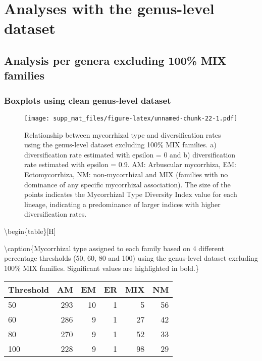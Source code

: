 \documentclass[]{article}
\begin{document}
\hypertarget{analyses-with-the-genus-level-dataset}{%
\section{Analyses with the genus-level
dataset}\label{analyses-with-the-genus-level-dataset}}

\hypertarget{analysis-per-genera-excluding-100-mix-families}{%
\subsection{Analysis per genera excluding 100\% MIX
families}\label{analysis-per-genera-excluding-100-mix-families}}

\hypertarget{boxplots-using-clean-genus-level-dataset}{%
\subsubsection{Boxplots using clean genus-level
dataset}\label{boxplots-using-clean-genus-level-dataset}}

\begin{figure}
\centering
\texttt{[image: supp\_mat\_files/figure-latex/unnamed-chunk-22-1.pdf]}
\caption{Relationship between mycorrhizal type and diversification rates
using the genus-level dataset excluding 100\% MIX families. a)
diversification rate estimated with epsilon = 0 and b) diversification
rate estimated with epsilon = 0.9. AM: Arbuscular mycorrhiza, EM:
Ectomycorrhiza, NM: non-mycorrhizal and MIX (families with no dominance
of any specific mycorrhizal association). The size of the points
indicates the Mycorrhizal Type Diversity Index value for each lineage,
indicating a predominance of larger indices with higher diversification
rates.}
\end{figure}

\textbackslash begin\{table\}{[}H{]}

\textbackslash caption\{\label{tab:unnamed-chunk-23}Mycorrhizal type
assigned to each family based on 4 different percentage thresholds (50,
60, 80 and 100) using the genus-level dataset excluding 100\% MIX
families. Significant values are highlighted in bold.\} \centering

\begin{tabular}{l|r|r|r|r|r}
\hline
Threshold & AM & EM & ER & MIX & NM\\
\hline
50 & 293 & 10 & 1 & 5 & 56\\
\hline
60 & 286 & 9 & 1 & 27 & 42\\
\hline
80 & 270 & 9 & 1 & 52 & 33\\
\hline
100 & 228 & 9 & 1 & 98 & 29\\
\hline
\end{tabular}
\end{document}
